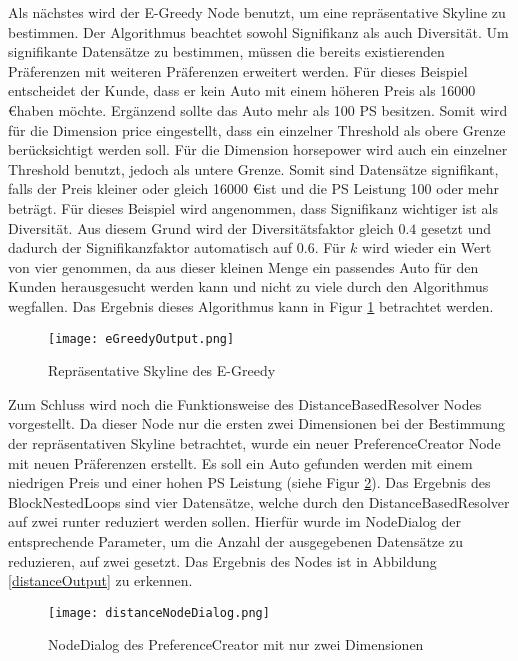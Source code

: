 Als nächstes wird der E-Greedy Node benutzt, um eine repräsentative Skyline zu bestimmen. Der Algorithmus beachtet sowohl Signifikanz als auch Diversität. Um signifikante Datensätze zu bestimmen, müssen die bereits existierenden Präferenzen mit weiteren Präferenzen erweitert werden. Für dieses Beispiel entscheidet der Kunde, dass er kein Auto mit einem höheren Preis als 16000 \euro haben möchte. Ergänzend sollte das Auto mehr als 100 PS besitzen. Somit wird für die Dimension price eingestellt, dass ein einzelner Threshold als obere Grenze berücksichtigt werden soll. Für die Dimension horsepower wird auch ein einzelner Threshold benutzt, jedoch als untere Grenze. Somit sind Datensätze signifikant, falls der Preis kleiner oder gleich 16000 \euro ist und die PS Leistung 100 oder mehr beträgt.
Für dieses Beispiel wird angenommen, dass Signifikanz wichtiger ist als Diversität. Aus diesem Grund wird der Diversitätsfaktor gleich $0.4$ gesetzt und dadurch der Signifikanzfaktor automatisch auf $0.6$. Für $k$ wird wieder ein Wert von vier genommen, da aus dieser kleinen Menge ein passendes Auto für den Kunden herausgesucht werden kann und nicht zu viele durch den Algorithmus wegfallen. Das Ergebnis dieses Algorithmus kann in Figur \ref{img:eGreedyOutput} betrachtet werden.

\begin{figure}[H]
	\centering
	\texttt{[image: eGreedyOutput.png]}
	\caption{Repräsentative Skyline des E-Greedy}
	\label{img:eGreedyOutput}
\end{figure} 

Zum Schluss wird noch die Funktionsweise des DistanceBasedResolver Nodes vorgestellt. Da dieser Node nur die ersten zwei Dimensionen bei der Bestimmung der repräsentativen Skyline betrachtet, wurde ein neuer PreferenceCreator Node mit neuen Präferenzen erstellt. Es soll ein Auto gefunden werden mit einem niedrigen Preis und einer hohen PS Leistung (siehe Figur \ref{img:distanceNodeDialog}). Das Ergebnis des BlockNestedLoops sind vier Datensätze, welche durch den DistanceBasedResolver auf zwei runter reduziert werden sollen. Hierfür wurde im NodeDialog der entsprechende Parameter, um die Anzahl der ausgegebenen Datensätze zu reduzieren, auf zwei gesetzt. Das Ergebnis des Nodes ist in Abbildung \ref{distanceOutput} zu erkennen.

\begin{figure}[H]
	\centering
	\texttt{[image: distanceNodeDialog.png]}
	\caption{NodeDialog des PreferenceCreator mit nur zwei Dimensionen}
	\label{img:distanceNodeDialog}
\end{figure} 

